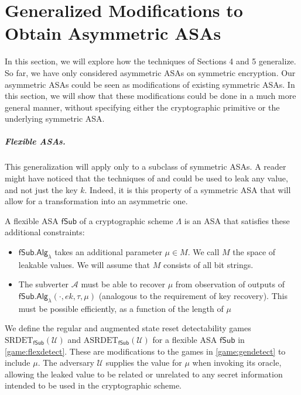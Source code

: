 \chapter{Generalized Modifications to Obtain Asymmetric ASAs} \label{sec:generalize}
In this section, we will explore how the techniques of Sections 4 and 5 generalize. So far, we have only considered asymmetric ASAs on symmetric encryption. Our asymmetric ASAs could be seen as modifications of existing symmetric ASAs. In this section, we will show that these modifications could be done in a much more general manner, without specifying either the cryptographic primitive or the underlying symmetric ASA.

\paragraph{Flexible ASAs.} This generalization will apply only to a subclass of symmetric ASAs. A reader might have noticed that the techniques of \cite{C:BelPatRog14} and \cite{CCS:BelJaeKan15} could be used to leak any value, and not just the key $k$. Indeed, it is this property of a symmetric ASA that will allow for a transformation into an asymmetric one.

A flexible ASA $\mathsf{fSub}$ of a cryptographic scheme $\mathsf{\Lambda}$ is an ASA that satisfies these additional constraints:
\begin{itemize}\itemsep0em
\item $\mathsf{fSub.Alg}_\lambda$ takes an additional parameter $\mu\in M$. We call $M$ the space of leakable values. We will assume that $M$ consists of all bit strings.
\item The subverter $\mathcal{A}$ must be able to recover $\mu$ from observation of outputs of $\mathsf{fSub.Alg}_\lambda(\cdot,\allowbreak{}ek,\tau,\mu)$ (analogous to the requirement of key recovery). This must be possible efficiently, as a function of the length of $\mu$
\end{itemize}

We define the regular and augmented state reset detectability games $\mathrm{SRDET}_\mathsf{fSub}(\mathcal{U})$ and $\mathrm{ASRDET}_\mathsf{fSub}(\mathcal{U})$ for a flexible ASA $\mathsf{fSub}$ in \autoref{game:flexdetect}. These are modifications to the games in \autoref{game:gendetect} to include $\mu$. The adversary $\mathcal{U}$ supplies the value for $\mu$ when invoking its oracle, allowing the leaked value to be related or unrelated to any secret information intended to be used in the cryptographic scheme.

